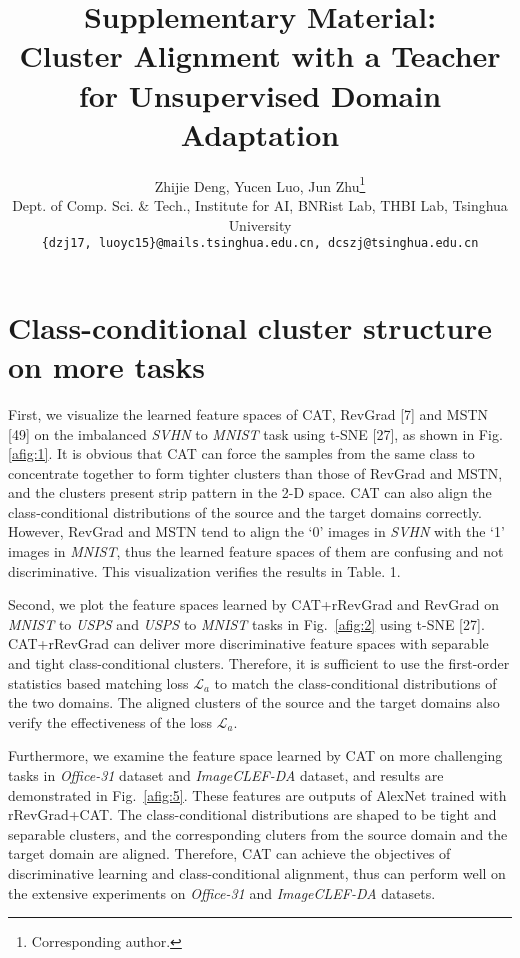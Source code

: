 \documentclass[10pt,twocolumn,letterpaper]{article}
\begin{document}
\title{Supplementary Material:\\
Cluster Alignment with a Teacher for Unsupervised Domain Adaptation}

\author{Zhijie Deng, Yucen Luo, Jun Zhu\thanks{Corresponding author.}\\
Dept. of Comp. Sci. \& Tech., Institute for AI, BNRist Lab, THBI Lab, Tsinghua University\\
{\tt\small \{dzj17, luoyc15\}@mails.tsinghua.edu.cn, dcszj@tsinghua.edu.cn}
}

\maketitle
\ificcvfinal\thispagestyle{empty}\fi

\appendix

\section{Class-conditional cluster structure on more tasks}

First, we visualize the learned feature spaces of CAT, RevGrad [7] and MSTN [49] on the imbalanced \emph{SVHN} to \emph{MNIST} task using t-SNE [27], as shown in Fig.\ref{afig:1}. It is obvious that CAT can force the samples from the same class to concentrate together to form tighter clusters than those of RevGrad and MSTN, and the clusters present strip pattern in the 2-D space. CAT can also align the class-conditional distributions of the source and the target domains correctly. However, RevGrad and MSTN tend to align the `0' images in \emph{SVHN} with the `1' images in \emph{MNIST}, thus the learned feature spaces of them are confusing and not discriminative. This visualization verifies the results in Table. 1.

Second, we plot the feature spaces learned by CAT+rRevGrad and RevGrad on \emph{MNIST} to \emph{USPS} and \emph{USPS} to \emph{MNIST} tasks in Fig.~\ref{afig:2} using t-SNE [27]. CAT+rRevGrad can deliver more discriminative feature spaces with separable and tight class-conditional clusters. Therefore, it is sufficient to use the first-order statistics based matching loss $\mathcal{L}_a$ to match the class-conditional distributions of the two domains. The aligned clusters of the source and the target domains also verify the effectiveness of the loss $\mathcal{L}_a$.

Furthermore, we examine the feature space learned by CAT on more challenging tasks in \emph{Office-31} dataset and \emph{ImageCLEF-DA} dataset, and results are demonstrated in Fig.~\ref{afig:5}. These features are outputs of AlexNet trained with rRevGrad+CAT. The class-conditional distributions are shaped to be tight and separable clusters, and the corresponding cluters from the source domain and the target domain are aligned. Therefore, CAT can achieve the objectives of discriminative learning and class-conditional alignment, thus can perform well on the extensive experiments on \emph{Office-31} and \emph{ImageCLEF-DA} datasets.
\end{document}
